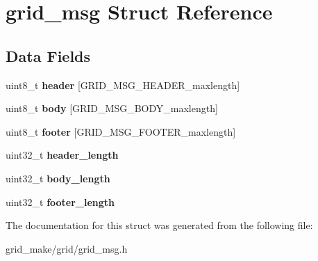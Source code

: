 \hypertarget{structgrid__msg}{\section{grid\-\_\-msg Struct Reference}
\label{structgrid__msg}
}
\subsection*{Data Fields}
\begin{DoxyCompactItemize}
\item 
\hypertarget{structgrid__msg_a3692b57adf1523172d88324c00526da4}{uint8\-\_\-t {\bfseries header} \mbox{[}G\-R\-I\-D\-\_\-\-M\-S\-G\-\_\-\-H\-E\-A\-D\-E\-R\-\_\-maxlength\mbox{]}}\label{structgrid__msg_a3692b57adf1523172d88324c00526da4}

\item 
\hypertarget{structgrid__msg_ab3b86c30d0c5764f0610f06add4ff69a}{uint8\-\_\-t {\bfseries body} \mbox{[}G\-R\-I\-D\-\_\-\-M\-S\-G\-\_\-\-B\-O\-D\-Y\-\_\-maxlength\mbox{]}}\label{structgrid__msg_ab3b86c30d0c5764f0610f06add4ff69a}

\item 
\hypertarget{structgrid__msg_af47fa42080437422de40efc20f146466}{uint8\-\_\-t {\bfseries footer} \mbox{[}G\-R\-I\-D\-\_\-\-M\-S\-G\-\_\-\-F\-O\-O\-T\-E\-R\-\_\-maxlength\mbox{]}}\label{structgrid__msg_af47fa42080437422de40efc20f146466}

\item 
\hypertarget{structgrid__msg_a0cb14dae146a164ace6ab276b5568f28}{uint32\-\_\-t {\bfseries header\-\_\-length}}\label{structgrid__msg_a0cb14dae146a164ace6ab276b5568f28}

\item 
\hypertarget{structgrid__msg_a0b285e66d3dea325aaa47ddcd3e1f532}{uint32\-\_\-t {\bfseries body\-\_\-length}}\label{structgrid__msg_a0b285e66d3dea325aaa47ddcd3e1f532}

\item 
\hypertarget{structgrid__msg_a3e597f2e7b254bb386bbaafcf53779bf}{uint32\-\_\-t {\bfseries footer\-\_\-length}}\label{structgrid__msg_a3e597f2e7b254bb386bbaafcf53779bf}

\end{DoxyCompactItemize}


The documentation for this struct was generated from the following file\-:\begin{DoxyCompactItemize}
\item 
grid\-\_\-make/grid/grid\-\_\-msg.\-h\end{DoxyCompactItemize}
